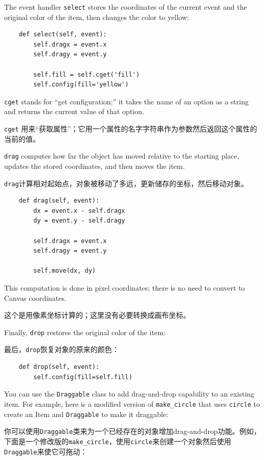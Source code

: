 \documentclass[10pt]{book}
\begin{document}
\begin{CJK}{UTF8}{gbsn}
The event handler {\tt select} stores the coordinates
of the current event and the original color of the item, then
changes the color to yellow:

\begin{verbatim}
    def select(self, event):
        self.dragx = event.x
        self.dragy = event.y

        self.fill = self.cget('fill')
        self.config(fill='yellow')
\end{verbatim}
%
{\tt cget} stands for ``get configuration;'' it takes the name of an
option as a string and returns the current value of that option.

{\tt cget} 用来``获取属性''；它用一个属性的名字字符串作为参数然后返回这个属性的当前的值。

{\tt drag} computes how far the object has moved relative to the
starting place, updates the stored coordinates, and then moves the
item.

{\tt drag}计算相对起始点，对象被移动了多远，更新储存的坐标，然后移动对象。

\begin{verbatim}
    def drag(self, event):
        dx = event.x - self.dragx
        dy = event.y - self.dragy

        self.dragx = event.x
        self.dragy = event.y

        self.move(dx, dy)
\end{verbatim}
%
This computation is done in pixel coordinates; there is no need to
convert to Canvas coordinates.

这个是用像素坐标计算的；这里没有必要转换成画布坐标。

Finally, {\tt drop} restores the original color of the item:

最后，{\tt drop}恢复对象的原来的颜色：

\begin{verbatim}
    def drop(self, event):
        self.config(fill=self.fill)
\end{verbatim}
%
You can use the {\tt Draggable} class to add drag-and-drop
capability to an existing item.  For example, here is a modified
version of \verb"make_circle" that uses {\tt circle} to create
an Item and {\tt Draggable} to make it draggable:

你可以使用{\tt Draggable}类来为一个已经存在的对象增加drag-and-drop功能。例如，
下面是一个修改版的\verb"make_circle"，使用{\tt circle}来创建一个对象然后使用
{\tt Draggable}来使它可拖动：


\end{CJK}
\end{document}
